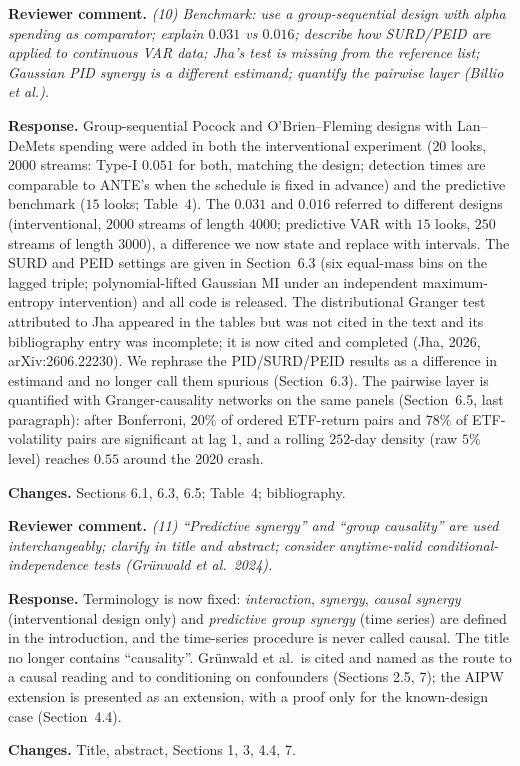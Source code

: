 \documentclass[11pt,a4paper]{article}
\newcommand{\rev}[1]{\par\noindent\textbf{Reviewer comment.} \emph{#1}}
\newcommand{\resp}{\par\noindent\textbf{Response.} }
\newcommand{\chg}{\par\noindent\textbf{Changes.} }
\begin{document}
\rev{(10) Benchmark: use a group-sequential design with alpha spending as comparator; explain $0.031$ vs $0.016$; describe how SURD/PEID are applied to continuous VAR data; Jha's test is missing from the reference list; Gaussian PID synergy is a different estimand; quantify the pairwise layer (Billio et al.).}
\resp Group-sequential Pocock and O'Brien--Fleming designs with Lan--DeMets spending were added in both the interventional experiment ($20$ looks, $2000$ streams: Type-I $0.051$ for both, matching the design; detection times are comparable to ANTE's when the schedule is fixed in advance) and the predictive benchmark ($15$ looks; Table~4). The $0.031$ and $0.016$ referred to different designs (interventional, $2000$ streams of length $4000$; predictive VAR with $15$ looks, $250$ streams of length $3000$), a difference we now state and replace with intervals. The SURD and PEID settings are given in Section~6.3 (six equal-mass bins on the lagged triple; polynomial-lifted Gaussian MI under an independent maximum-entropy intervention) and all code is released. The distributional Granger test attributed to Jha appeared in the tables but was not cited in the text and its bibliography entry was incomplete; it is now cited and completed (Jha, 2026, arXiv:2606.22230). We rephrase the PID/SURD/PEID results as a difference in estimand and no longer call them spurious (Section~6.3). The pairwise layer is quantified with Granger-causality networks on the same panels (Section~6.5, last paragraph): after Bonferroni, $20\%$ of ordered ETF-return pairs and $78\%$ of ETF-volatility pairs are significant at lag $1$, and a rolling $252$-day density (raw $5\%$ level) reaches $0.55$ around the 2020 crash.
\chg Sections 6.1, 6.3, 6.5; Table~4; bibliography.

\rev{(11) ``Predictive synergy'' and ``group causality'' are used interchangeably; clarify in title and abstract; consider anytime-valid conditional-independence tests (Gr\"unwald et al.\ 2024).}
\resp Terminology is now fixed: \emph{interaction}, \emph{synergy}, \emph{causal synergy} (interventional design only) and \emph{predictive group synergy} (time series) are defined in the introduction, and the time-series procedure is never called causal. The title no longer contains ``causality''. Gr\"unwald et al.\ is cited and named as the route to a causal reading and to conditioning on confounders (Sections 2.5, 7); the AIPW extension is presented as an extension, with a proof only for the known-design case (Section~4.4).
\chg Title, abstract, Sections 1, 3, 4.4, 7.
\end{document}
